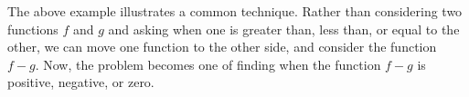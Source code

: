 \documentclass[noauthor, nooutcomes]{ximera}
\begin{document}
The above example illustrates a common technique. Rather than considering two functions $f$ and $g$ and asking when one is greater than, less than, or equal to the other, we can move one function to the other side, and consider the function $f - g$. Now, the problem becomes one of finding when the function $f - g$ is positive, negative, or zero. 
\end{document}
